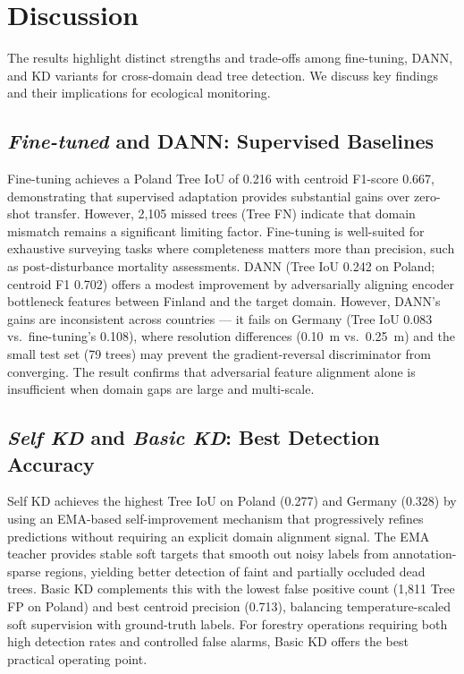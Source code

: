 \documentclass[twocolumn]{article}
\begin{document}
\section{Discussion}
\label{sec:discussion}

The results highlight distinct strengths and trade-offs among fine-tuning, DANN, and KD variants for cross-domain dead tree detection. We discuss key findings and their implications for ecological monitoring.

\subsection{\textit{Fine-tuned} and DANN: Supervised Baselines}
Fine-tuning achieves a Poland Tree IoU of 0.216 with centroid F1-score 0.667, demonstrating that supervised adaptation provides substantial gains over zero-shot transfer. However, 2,105 missed trees (Tree FN) indicate that domain mismatch remains a significant limiting factor. Fine-tuning is well-suited for exhaustive surveying tasks where completeness matters more than precision, such as post-disturbance mortality assessments. DANN (Tree IoU 0.242 on Poland; centroid F1 0.702) offers a modest improvement by adversarially aligning encoder bottleneck features between Finland and the target domain. However, DANN's gains are inconsistent across countries — it fails on Germany (Tree IoU 0.083 vs.\ fine-tuning's 0.108), where resolution differences (0.10~m vs.\ 0.25~m) and the small test set (79 trees) may prevent the gradient-reversal discriminator from converging. The result confirms that adversarial feature alignment alone is insufficient when domain gaps are large and multi-scale.

\subsection{\textit{Self KD} and \textit{Basic KD}: Best Detection Accuracy}
Self KD achieves the highest Tree IoU on Poland (0.277) and Germany (0.328) by using an EMA-based self-improvement mechanism that progressively refines predictions without requiring an explicit domain alignment signal. The EMA teacher provides stable soft targets that smooth out noisy labels from annotation-sparse regions, yielding better detection of faint and partially occluded dead trees. Basic KD complements this with the lowest false positive count (1,811 Tree FP on Poland) and best centroid precision (0.713), balancing temperature-scaled soft supervision with ground-truth labels. For forestry operations requiring both high detection rates and controlled false alarms, Basic KD offers the best practical operating point.
\end{document}
